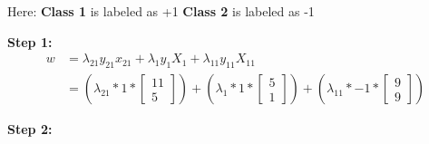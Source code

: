 \documentclass[12pt]{report}
\begin{document}
Here:\newline
\textbf{Class 1} is labeled as +1 \newline
\textbf{Class 2} is labeled as -1

\textbf{Step 1:}\newline\newline
\begin{equation*}
	\begin{aligned}
		w & = \lambda_{21}y_{21}x_{21} + \lambda_{1}y_{1}X_{1} + \lambda_{11}y_{11}X_{11}                                  \\
		  & = (\lambda_{21} * 1 * \begin{bmatrix}
			                          11 \\
			                          5
		                          \end{bmatrix}) + (\lambda_{1} * 1 * \begin{bmatrix}
			                                                              5 \\
			                                                              1
		                                                              \end{bmatrix}) + (\lambda_{11} * -1 * \begin{bmatrix}
			                                                                                                    9 \\
			                                                                                                    9
		                                                                                                    \end{bmatrix})
	\end{aligned}
\end{equation*}

\textbf{Step 2:}
\end{document}
